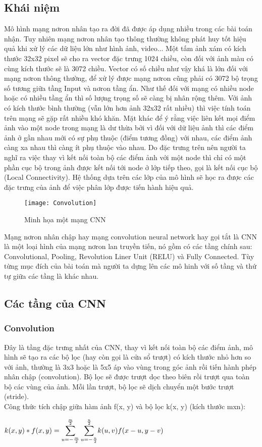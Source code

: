 \documentclass[13pt, a4paper]{extreport}
\begin{document}
\subsection{Khái niệm}
\indent Mô hình mạng nơron nhân tạo ra đời đã được áp dụng nhiều trong các bài toán nhận. Tuy nhiên mạng nơron nhân tạo thông thường không phát huy tốt hiệu quả khi xử lý các dữ liệu lớn như hình ảnh, video... Một tấm ảnh xám có kích thước 32x32 pixel sẽ cho ra vector đặc trưng 1024 chiều, còn đối với ảnh màu có cùng kích thước sẽ là 3072 chiều. Vector có số chiều như vậy khá là lớn đối với mạng nơron thông thường, để xử lý được mạng nơron cũng phải có 3072 bộ trọng số tương  giữa tầng Input và nơron tầng ẩn. Như thế đối với mạng có nhiều node hoặc có nhiều tầng ẩn thì số lượng trọng số sẽ càng bị nhân rộng thêm. Với ảnh có kích thước bình thường (vẫn lớn hơn ảnh 32x32 rất nhiều) thì việc tính toán trên mạng sẽ gặp rất nhiều khó khăn.
\indent Mặt khác để ý rằng việc liên kết mọi điểm ảnh vào một node trong mạng là dư thừa bởi vì đối với dữ liệu ảnh thì các điểm ảnh ở gần nhau mới có sự phụ thuộc (điểm tương đồng) với nhau, các điểm ảnh càng xa nhau thì càng ít phụ thuộc vào nhau. Do đặc trưng trên nên người ta nghĩ ra việc thay vì kết nối toàn bộ các điểm ảnh với một node thì chỉ có một phần cục bộ trong ảnh được kết nối tới node ở lớp tiếp theo, gọi là kết nối cục bộ (Local Connectivity). Hệ thống dựa trên các lớp của mô hình sẽ học ra được các đặc trưng của ảnh để việc phân lớp được tiến hành hiệu quả.
  \begin{figure}[H]
  	\centering
    \texttt{[image: Convolution]}
    \caption{\large Minh họa một mạng CNN}
  \end{figure}
\indent Mạng nơron nhân chập hay mạng convolution neural network hay gọi tắt là CNN là một loại hình của mạng nơron lan truyền tiến, nó gồm có các tầng chính sau: Convolutional, Pooling, Revolution Liner Unit (RELU) và Fully Connected. Tùy từng mục đích của bài toán mà người ta dựng lên các mô hinh với số tầng và thứ tự giữa các tầng là khác nhau.

\subsection{Các tầng của CNN}
\subsubsection{Convolution}
\indent Đây là tầng đặc trưng nhất của CNN, thay vì kết nối toàn bộ các điểm ảnh, mô hình sẽ tạo ra các bộ lọc (hay còn gọi là cửa sổ trượt) có kích thước nhỏ hơn so với ảnh, thường là 3x3 hoặc là 5x5 áp vào vùng trong góc ảnh rồi tiến hành phép nhân chập (convolution). Bộ lọc sẽ được trượt dọc theo biên rồi trượt qua toàn bộ các vùng của ảnh. Mỗi lần trượt, bộ lọc sẽ dịch chuyển một bước trượt (stride). \\
\indent Công thức tích chập giữa hàm ảnh f(x, y) và bộ lọc k(x, y) (kích thước mxn):
\begin{center}
$k(x, y) * f(x, y) = \mathlarger{\sum\limits_{u=-\frac{m}{2}}^{\frac{m}{2}}\sum\limits_{u=-\frac{n}{2}}^{\frac{n}{2}}}k(u, v)f(x-u, y-v) $
\end{center}
\end{document}
